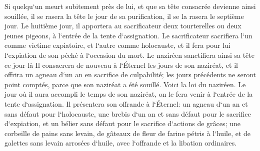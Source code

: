 \verse Si quelqu`un meurt subitement près de lui, et que sa tête consacrée devienne ainsi souillée, il se rasera la tête le jour de sa purification, il se la rasera le septième jour. 
\verse Le huitième jour, il apportera au sacrificateur deux tourterelles ou deux jeunes pigeons, à l`entrée de la tente d`assignation. 
\verse Le sacrificateur sacrifiera l`un comme victime expiatoire, et l`autre comme holocauste, et il fera pour lui l`expiation de son péché à l`occasion du mort. Le naziréen sanctifiera ainsi sa tête ce jour-là 
\verse Il consacrera de nouveau à l`Éternel les jours de son naziréat, et il offrira un agneau d`un an en sacrifice de culpabilité; les jours précédents ne seront point comptés, parce que son naziréat a été souillé. 
\verse Voici la loi du naziréen. Le jour où il aura accompli le temps de son naziréat, on le fera venir à l`entrée de la tente d`assignation. 
\verse Il présentera son offrande à l`Éternel: un agneau d`un an et sans défaut pour l`holocauste, une brebis d`un an et sans défaut pour le sacrifice d`expiation, et un bélier sans défaut pour le sacrifice d`actions de grâces; 
\verse une corbeille de pains sans levain, de gâteaux de fleur de farine pétris à l`huile, et de galettes sans levain arrosées d`huile, avec l`offrande et la libation ordinaires. 
